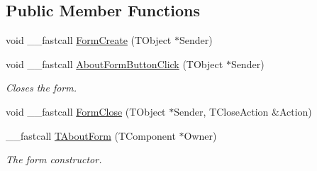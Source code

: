 \subsection*{Public Member Functions}
\begin{DoxyCompactItemize}
\item 
void \+\_\+\+\_\+fastcall \mbox{\hyperlink{class_t_about_form_ad2cb3d318c91018ed8986c8315ccd52b}{Form\+Create}} (T\+Object $\ast$Sender)
\item 
\mbox{\label{class_t_about_form_a8e868f7264a80fda52fc8c0e8290eb3f}} 
void \+\_\+\+\_\+fastcall \mbox{\hyperlink{class_t_about_form_a8e868f7264a80fda52fc8c0e8290eb3f}{About\+Form\+Button\+Click}} (T\+Object $\ast$Sender)
\begin{DoxyCompactList}\small\item\em Closes the form. \end{DoxyCompactList}\item 
void \+\_\+\+\_\+fastcall \mbox{\hyperlink{class_t_about_form_acddaba886282fa0cb6aa0ee77520fb05}{Form\+Close}} (T\+Object $\ast$Sender, T\+Close\+Action \&Action)
\item 
\mbox{\label{class_t_about_form_a5f857ee166c84e44aa329cbf5e2b9400}} 
\+\_\+\+\_\+fastcall \mbox{\hyperlink{class_t_about_form_a5f857ee166c84e44aa329cbf5e2b9400}{T\+About\+Form}} (T\+Component $\ast$Owner)
\begin{DoxyCompactList}\small\item\em The form constructor. \end{DoxyCompactList}\end{DoxyCompactItemize}
